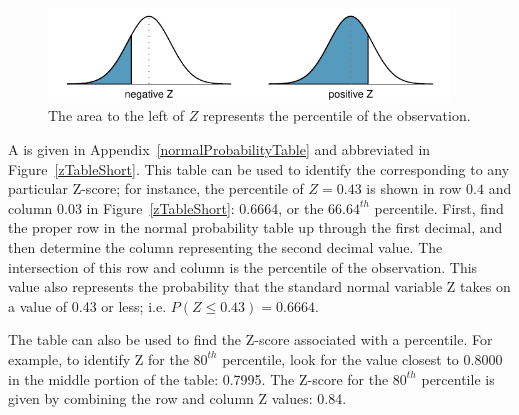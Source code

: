 \begin{figure}[h]
	\centering
	\includegraphics[width=0.95\textwidth]{ch_distributions_oi_biostat/figures/normalTails/normalTails}
	\caption{The area to the left of $Z$ represents the percentile of the observation.}
	\label{normalTails}
\end{figure}

\textD{\newpage}

A  is given in Appendix~\vref{normalProbabilityTable} and abbreviated in Figure~\ref{zTableShort}. This table can be used to identify the  corresponding to any particular Z-score; for instance, the percentile of $Z=0.43$ is shown in row $0.4$ and column $0.03$ in Figure~\ref{zTableShort}: 0.6664, or the $66.64^{th}$ percentile. First, find the proper row in the normal probability table up through the first decimal, and then determine the column representing the second decimal value. The intersection of this row and column is the percentile of the observation. This value also represents the probability that the standard normal variable Z takes on a value of 0.43 or less; i.e. $P(Z \leq 0.43) = 0.6664$.

The table can also be used to find the Z-score associated with a percentile. For example, to identify Z for the $80^{th}$ percentile, look for the value closest to 0.8000 in the middle portion of the table: 0.7995. The Z-score for the $80^{th}$ percentile is given by combining the row and column Z values: 0.84.


